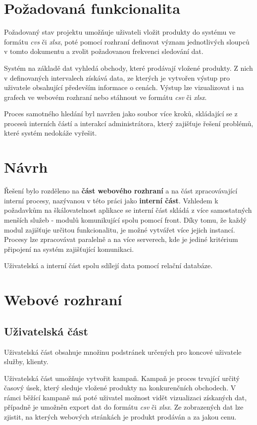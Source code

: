 \documentclass[thesis=B,czech]{FITthesis}[2012/06/26]
\begin{document}
\section{Požadovaná funkcionalita}
Požadovaný stav projektu umožňuje uživateli vložit produkty do systému ve formátu \textit{cvs} či \textit{xlsx}, poté pomocí
rozhraní definovat význam jednotlivých sloupců v tomto dokumentu a zvolit požadovanou frekvenci sledování dat.
\par
Systém na základě dat vyhledá obchody, které prodávají vložené produkty. Z nich v definovaných intervalech získává data, ze kterých je vytvořen výstup pro uživatele obsahující především informace o cenách. Výstup lze vizualizovat i na grafech ve webovém rozhraní nebo stáhnout ve formátu
\textit{csv} či \textit{xlsx}.
\par
Proces samotného hledání byl navržen jako soubor více kroků, skládající se z procesů interních částí a interakcí administrátora, který zajišťuje
řešení problémů, které systém nedokáže vyřešit.

\section{Návrh}
Řešení bylo rozděleno na \textbf{část webového rozhraní} a na část zpracovávající interní procesy, nazývanou v této práci 
jako \textbf{interní část}.
Vzhledem k požadavkům na škálovatelnost aplikace se interní část skládá z více samostatných menších služeb - modulů komunikující
spolu pomocí front. Díky tomu, že každý modul zajišťuje určitou funkcionalitu, je možné vytvářet více jejich instancí. Procesy lze 
zpracovávat paralelně a na více serverech, kde je jediné kritérium připojení na systém zajišťující komunikaci.
\par
Uživatelská a interní část spolu sdílejí data pomocí relační databáze\cite{DB}.

\section{Webové rozhraní}

\subsection{Uživatelská část}\label{ch:analysis-front-end}
Uživatelská část obsahuje množinu podstránek určených pro koncové uživatele
služby, klienty.
\par
Uživatelská část umožňuje vytvořit kampaň. Kampaň je proces trvající určitý časový úsek, který sleduje vložené produkty na konkurenčních
obchodech.
V rámci běžící kampaně má poté uživatel možnost vidět vizualizaci získaných dat, případně je umožněn export dat do formátu
\textit{csv} či \textit{xlsx}. Ze zobrazených dat lze zjistit, na kterých webových stránkách je produkt prodáván a za jakou cenu.
\end{document}
